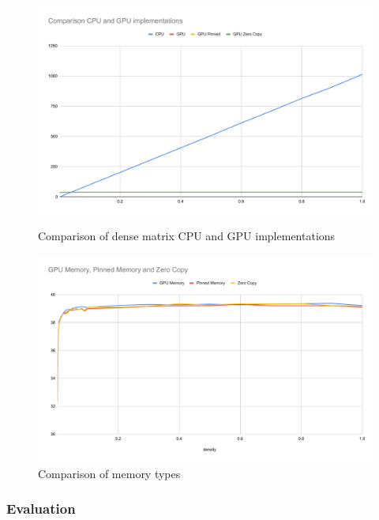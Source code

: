 \documentclass[letta4 paper]{article}
\numberwithin{equation}{section}
\newcommand{\0}{\mathbf{0}}
\begin{document}
\begin{figure}
    \centering
    \begin{minipage}{.5\textwidth}
    	\centering
    	\includegraphics[width=\linewidth]{img/dense_representation/comparison_impl.pdf}
    	\caption{Comparison of dense matrix CPU and GPU implementations}
    	\label{fig:dense_matrix_impl_comparison}
    \end{minipage}%
    \begin{minipage}{.5\textwidth}
    	\centering
    	\includegraphics[width=\linewidth]{img/dense_representation/memoyr_comparison.pdf}
    	\caption{Comparison of memory types}
    	\label{fig:dense_matrix_memory_comparison}
    \end{minipage}
\end{figure}

\subsubsection{Evaluation}
\end{document}
